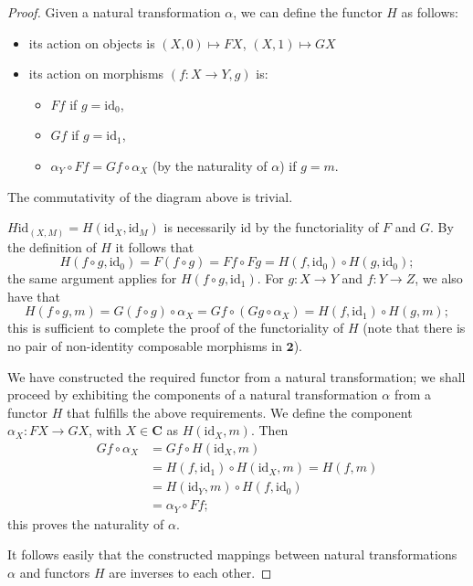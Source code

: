 \documentclass[a5paper,oneside,11pt]{article}
\newcommand\id{\mathord{\mathrm{id}}}
\newcommand\1{\mathord{\mathrm{1}}}
\newcommand\cat[1]{\mathbf{#1}}
\begin{document}
\begin{proof}
    Given a natural transformation $\alpha$, we can define the functor $H$ as follows:
    \begin{itemize}
        \item its action on objects is $(X, 0) \mapsto FX$, $(X, 1) \mapsto GX$
        \item its action on morphisms $(f : X \longrightarrow Y, g)$ is:
            \begin{itemize}
                \item $Ff$ if $g = \id_0$,
                \item $Gf$ if $g = \id_1$,
                \item $\alpha_Y \circ Ff = Gf \circ \alpha_X$ (by the naturality of $\alpha$)
                    if $g = m$.
            \end{itemize}
    \end{itemize}
    The commutativity of the diagram above is trivial.

    $H\id_{(X, M)} = H(\id_X, \id_M)$ is necessarily $\id$ by the functoriality of $F$ and $G$.
    By the definition of $H$ it follows that
    $$H(f \circ g, \id_0) = F(f \circ g) = Ff \circ Fg = H(f, \id_0) \circ H(g, \id_0);$$ the same
    argument applies for $H(f \circ g, \id_1)$.
    For $g : X \rightarrow Y$ and $f : Y \rightarrow Z$, we also have that
    $$H(f \circ g, m) = G(f \circ g) \circ \alpha_X = Gf \circ (Gg \circ \alpha_X) =
    H(f, \id_1) \circ H(g, m);$$ this is sufficient to complete the proof of the functoriality
    of $H$ (note that there is no pair of non-identity composable morphisms in $\cat{2}$).

    We have constructed the required functor from a natural transformation; we shall proceed by
    exhibiting the components of a natural transformation $\alpha$
    from a functor $H$ that fulfills the above requirements.
    We define the component $\alpha_X : FX \rightarrow GX$, with $X \in \cat{C}$ as $H(\id_X, m)$.
    Then
    \begin{equation*}
        \begin{split}
            Gf \circ \alpha_X &= Gf \circ H(\id_X, m) \\ &= H(f, \id_1) \circ H(\id_X, m) =
            H(f, m) \\ &= H(\id_Y, m) \circ H(f, \id_0) \\ &= \alpha_Y \circ Ff;
        \end{split}
    \end{equation*}
    this proves the naturality of $\alpha$.

    It follows easily that the constructed mappings between natural
    transformations $\alpha$ and functors $H$ are inverses to each other.
\end{proof}
\end{document}
